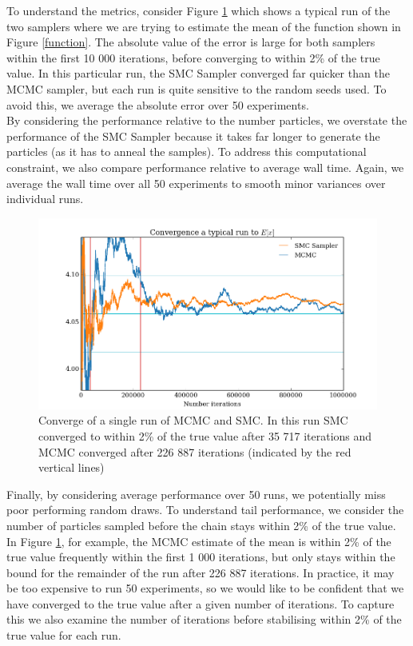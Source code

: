 \documentclass[12pt]{elsarticle}
\begin{document}
To understand the metrics, consider Figure \ref{convergence} which shows a typical run of the two samplers where we are trying to estimate the mean of the function shown in Figure \ref{function}. The absolute value of the error is large for both samplers within the first 10 000 iterations, before converging to within 2\% of the true value. In this particular run, the SMC Sampler converged far quicker than the MCMC sampler, but each run is quite sensitive to the random seeds used. To avoid this, we average the absolute error over 50 experiments. \\

By considering the performance relative to the number particles, we overstate the performance of the SMC Sampler because it takes far longer to generate the particles (as it has to anneal the samples). To address this computational constraint, we also compare performance relative to average wall time. Again, we average the wall time over all 50 experiments to smooth minor variances over individual runs. \\


\begin{figure}[htbp]
\begin{center}
\includegraphics[width = \textwidth]{plots/Convergence.png}
\caption{Converge of a single run of MCMC and SMC. In this run SMC converged to within 2\% of the true value after 35 717 iterations and MCMC converged after 226 887 iterations (indicated by the red vertical lines)}
\label{convergence}
\end{center}
\end{figure}

Finally, by considering average performance over 50 runs, we potentially miss poor performing random draws. To understand tail performance, we consider the number of particles sampled before the chain stays within 2\% of the true value. In Figure  \ref{convergence}, for example, the MCMC estimate of the mean is within 2\% of the true value frequently within the first 1 000 iterations, but only stays within the bound for the remainder of the run after 226 887 iterations. In practice, it may be too expensive to run 50 experiments, so we would like to be confident that we have converged to the true value after a given number of iterations. To capture this we also examine the number of iterations before stabilising within 2\% of the true value for each run.
\end{document}
